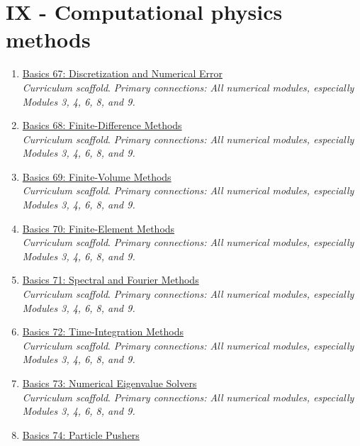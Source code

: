\documentclass[11pt]{article}
\begin{document}
\section{IX - Computational physics methods}
\begin{enumerate}[leftmargin=2.4em]
\item[\textbf{67.}] \href{run:basics_67_discretization_and_numerical_error.pdf}{Basics 67: Discretization and Numerical Error}\\[-0.2em]
\textit{Curriculum scaffold}. \textit{Primary connections: All numerical modules, especially Modules 3, 4, 6, 8, and 9.}
\item[\textbf{68.}] \href{run:basics_68_finite_difference_methods.pdf}{Basics 68: Finite-Difference Methods}\\[-0.2em]
\textit{Curriculum scaffold}. \textit{Primary connections: All numerical modules, especially Modules 3, 4, 6, 8, and 9.}
\item[\textbf{69.}] \href{run:basics_69_finite_volume_methods.pdf}{Basics 69: Finite-Volume Methods}\\[-0.2em]
\textit{Curriculum scaffold}. \textit{Primary connections: All numerical modules, especially Modules 3, 4, 6, 8, and 9.}
\item[\textbf{70.}] \href{run:basics_70_finite_element_methods.pdf}{Basics 70: Finite-Element Methods}\\[-0.2em]
\textit{Curriculum scaffold}. \textit{Primary connections: All numerical modules, especially Modules 3, 4, 6, 8, and 9.}
\item[\textbf{71.}] \href{run:basics_71_spectral_and_fourier_methods.pdf}{Basics 71: Spectral and Fourier Methods}\\[-0.2em]
\textit{Curriculum scaffold}. \textit{Primary connections: All numerical modules, especially Modules 3, 4, 6, 8, and 9.}
\item[\textbf{72.}] \href{run:basics_72_time_integration_methods.pdf}{Basics 72: Time-Integration Methods}\\[-0.2em]
\textit{Curriculum scaffold}. \textit{Primary connections: All numerical modules, especially Modules 3, 4, 6, 8, and 9.}
\item[\textbf{73.}] \href{run:basics_73_numerical_eigenvalue_solvers.pdf}{Basics 73: Numerical Eigenvalue Solvers}\\[-0.2em]
\textit{Curriculum scaffold}. \textit{Primary connections: All numerical modules, especially Modules 3, 4, 6, 8, and 9.}
\item[\textbf{74.}] \href{run:basics_74_particle_pushers.pdf}{Basics 74: Particle Pushers}\\[-0.2em]

\end{enumerate}
\end{document}
